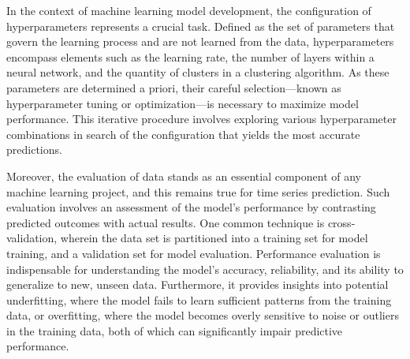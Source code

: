 In the context of machine learning model development, the configuration of hyperparameters represents a crucial task.
Defined as the set of parameters that govern the learning process and are not learned from the data, hyperparameters encompass elements such as the learning rate, the number of layers within a neural network, and the quantity of clusters in a clustering algorithm.
As these parameters are determined a priori, their careful selection—known as hyperparameter tuning or optimization—is necessary to maximize model performance.
This iterative procedure involves exploring various hyperparameter combinations in search of the configuration that yields the most accurate predictions.

Moreover, the evaluation of data stands as an essential component of any machine learning project, and this remains true for time series prediction.
Such evaluation involves an assessment of the model's performance by contrasting predicted outcomes with actual results.
One common technique is cross-validation, wherein the data set is partitioned into a training set for model training, and a validation set for model evaluation.
Performance evaluation is indispensable for understanding the model's accuracy, reliability, and its ability to generalize to new, unseen data.
Furthermore, it provides insights into potential underfitting, where the model fails to learn sufficient patterns from the training data, or overfitting, where the model becomes overly sensitive to noise or outliers in the training data, both of which can significantly impair predictive performance.

